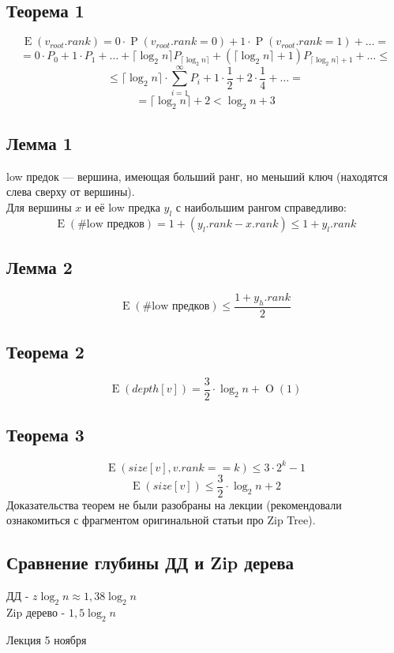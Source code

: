\documentclass[12pt, a4paper]{article}
\begin{document}
    \subsection{Теорема 1}
    \[\operatorname E(v_{root}.rank) = 0\cdot \operatorname P(v_{root}.rank = 0) + 1\cdot \operatorname P(v_{root}.rank = 1) + \dots = \]
    \[ = 0\cdot P_0 + 1 \cdot P_1 + \dots  + \lceil\log_2 n\rceil P_{\lceil\log_2 n\rceil} + (\lceil\log_2 n\rceil + 1) P_{\lceil\log_2 n\rceil + 1}  + \dots \leq\]
    \[\leq \lceil\log_2 n\rceil\cdot \sum_{i = 1}^{\infty}P_i + 1\cdot \frac{1}{2} + 2\cdot \frac{1}{4} + \dots = \]
    \[ = \lceil\log_2 n\rceil + 2 < \log_2 n + 3\]
    \subsection{Лемма 1}
    low предок --- вершина, имеющая больший ранг, но меньший ключ (находятся слева сверху от вершины).\\
    Для вершины $x$ и её low предка $y_l$ с наибольшим рангом справедливо: 
    \[\operatorname E(\text{\#low предков})  = 1 + (y_l.rank - x.rank) \leq 1 + y_l.rank\]

    \subsection{Лемма 2}
    \[\operatorname E(\text{\#low предков}) \leq \frac{1 + y_h.rank}{2}\]

    \subsection{Теорема 2}
    \[\operatorname E(depth[v]) = \frac{3}{2}\cdot \log_2 n + \operatorname O(1)\]

    \subsection{Теорема 3}
    \[\operatorname E (size[v], v.rank == k) \leq 3\cdot 2^k - 1\]
    \[\operatorname E(size[v]) \leq \frac{3}{2} \cdot \log_2 n + 2\]
    Доказательства теорем не были разобраны на лекции (рекомендовали ознакомиться с фрагментом оригинальной статьи про Zip Tree).
    \subsection*{Сравнение глубины ДД и Zip дерева}
    ДД - $z\log_2 n \approx 1,38\log_2 n$\\
    Zip дерево - $1,5\log_2 n$
    \begin{center}
        Лекция 5 ноября
    \end{center}
\end{document}
